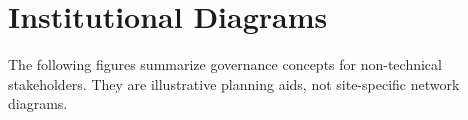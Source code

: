 \section{Institutional Diagrams}
\label{sec:institutional-diagrams}

The following figures summarize governance concepts for non-technical stakeholders.
They are illustrative planning aids, not site-specific network diagrams.





